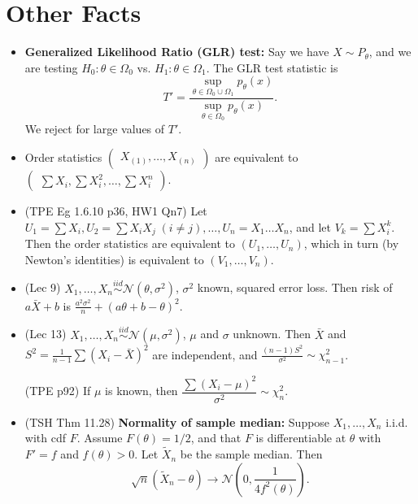 \documentclass[twoside]{article}
\newcommand{\dis}{\displaystyle}
\newcommand\calN{\mathcal{N}}
\newcommand\Om{\Omega}
\newcommand\sg{\sigma}
\def\t{\theta}
\newcommand\goesto{\rightarrow}
\begin{document}
\section*{Other Facts}
\begin{itemize}
\item \textbf{Generalized Likelihood Ratio (GLR) test:} Say we have $X \sim P_\t$, and we are testing $H_0: \t \in \Om_0$ vs. $H_1: \t \in \Om_1$. The GLR test statistic is
\begin{equation*}
T' = \frac{\dis\sup_{\t \in \Om_0 \cup \Om_1} p_\t(x)}{\dis\sup_{\t \in \Om_0} p_\t(x)}.
\end{equation*}
We reject for large values of $T'$.

\item Order statistics $\begin{pmatrix} X_{(1)}, \dots, X_{(n)} \end{pmatrix}$ are equivalent to $\begin{pmatrix} \sum X_i, \sum X_i^2, \dots, \sum X_i^n \end{pmatrix}$.

\item (TPE Eg 1.6.10 p36, HW1 Qn7) Let $U_1 = \sum X_i, U_2 = \sum X_iX_j \; (i \neq j), \dots, U_n = X_1 \dots X_n$, and let $V_k = \sum X_i^k$. Then the order statistics are equivalent to $(U_1, \dots, U_n)$, which in turn (by Newton's identities) is equivalent to $(V_1, \dots, V_n)$.

\item (Lec 9) $X_1, \dots, X_n \stackrel{iid}{\sim} \calN(\t, \sg^2)$, $\sg^2$ known, squared error loss. Then risk of $a \bar{X} + b$ is $\displaystyle\frac{a^2 \sg^2}{n} + (a\t + b - \t)^2$.

\item (Lec 13) $X_1, \dots, X_n \stackrel{iid}{\sim} \calN(\mu, \sg^2)$, $\mu$ and $\sg$ unknown. Then $\bar{X}$ and $S^2 = \displaystyle\frac{1}{n-1}\sum (X_i - \bar{X})^2$ are independent, and $\displaystyle\frac{(n-1)S^2}{\sg^2} \sim \chi_{n-1}^2$.

(TPE p92) If $\mu$ is known, then $\dfrac{\sum (X_i - \mu)^2}{\sg^2} \sim \chi_n^2$.

\item (TSH Thm 11.28) \textbf{Normality of sample median:} Suppose $X_1, \dots, X_n$ i.i.d. with cdf $F$. Assume $F(\t) = 1/2$, and that $F$ is differentiable at $\t$ with $F' = f$ and $f(\t) > 0$. Let $\tilde{X}_n$ be the sample median. Then
\begin{equation*}
\sqrt{n} (\tilde{X}_n - \t) \goesto \calN \left( 0, \frac{1}{4f^2(\t)}\right).
\end{equation*}
\end{itemize}
\end{document}

